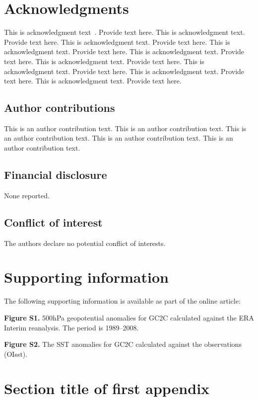 \documentclass[AMS,STIX1COL]{WileyNJD-v2}
\begin{document}

\section*{Acknowledgments}
This is acknowledgment text~\cite{Elbaum2002}. Provide text here. This is acknowledgment text. Provide text here. This is acknowledgment text. Provide text here. This is acknowledgment text. Provide text here. This is acknowledgment text. Provide text here. This is acknowledgment text. Provide text here. This is acknowledgment text. Provide text here. This is acknowledgment text. Provide text here. This is acknowledgment text. Provide text here. 

\subsection*{Author contributions}

This is an author contribution text. This is an author contribution text. This is an author contribution text. This is an author contribution text. This is an author contribution text. 

\subsection*{Financial disclosure}

None reported.

\subsection*{Conflict of interest}

The authors declare no potential conflict of interests.


\section*{Supporting information}

The following supporting information is available as part of the online article:

\noindent
\textbf{Figure S1.}
{500{\uns}hPa geopotential anomalies for GC2C calculated against the ERA Interim reanalysis. The period is 1989--2008.}

\noindent
\textbf{Figure S2.}
{The SST anomalies for GC2C calculated against the observations (OIsst).}


\appendix

\section{Section title of first appendix\label{app1}}
\end{document}
